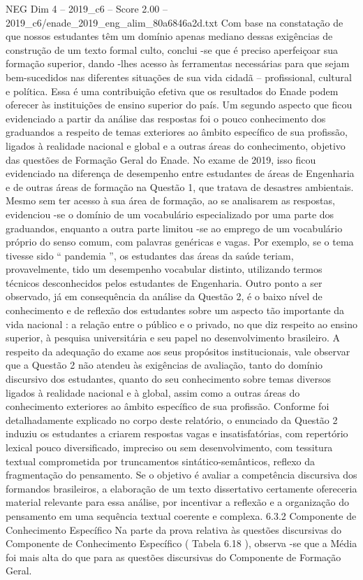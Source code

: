 \begin{textsample}{NEG Dim 4 – 2019\_c6 – Score 2.00 – 2019\_c6/enade\_2019\_eng\_alim\_80a6846a2d.txt}
Com base na constatação de que nossos estudantes têm um domínio apenas mediano dessas exigências de construção de um texto formal culto, conclui -se que é preciso aperfeiçoar sua formação superior, dando -lhes acesso às ferramentas necessárias para que sejam bem-sucedidos nas diferentes situações de sua vida cidadã – profissional, cultural e política.
Essa é uma contribuição efetiva que os resultados do Enade podem oferecer às instituições de ensino superior do país.
Um segundo aspecto que ficou evidenciado a partir da análise das respostas foi o pouco conhecimento dos graduandos a respeito de temas exteriores ao âmbito específico de sua profissão, ligados à realidade nacional e global e a outras áreas do conhecimento, objetivo das questões de Formação Geral do Enade.
No exame de 2019, isso ficou evidenciado na diferença de desempenho entre estudantes de áreas de Engenharia e de outras áreas de formação na Questão 1, que tratava de desastres ambientais.
Mesmo sem ter acesso à sua área de formação, ao se analisarem as respostas, evidenciou -se o domínio de um vocabulário especializado por uma parte dos graduandos, enquanto a outra parte limitou -se ao emprego de um vocabulário próprio do senso comum, com palavras genéricas e vagas.
Por exemplo, se o tema tivesse sido “ pandemia ”, os estudantes das áreas da saúde teriam, provavelmente, tido um desempenho vocabular distinto, utilizando termos técnicos desconhecidos pelos estudantes de Engenharia.
Outro ponto a ser observado, já em consequência da análise da Questão 2, é o baixo nível de conhecimento e de reflexão dos estudantes sobre um aspecto tão importante da vida nacional : a relação entre o público e o privado, no que diz respeito ao ensino superior, à pesquisa universitária e seu papel no desenvolvimento brasileiro.
A respeito da adequação do exame aos seus propósitos institucionais, vale observar que a Questão 2 não atendeu às exigências de avaliação, tanto do domínio discursivo dos estudantes, quanto do seu conhecimento sobre temas diversos ligados à realidade nacional e à global, assim como a outras áreas do conhecimento exteriores ao âmbito específico de sua profissão.
Conforme foi detalhadamente explicado no corpo deste relatório, o enunciado da Questão 2 induziu os estudantes a criarem respostas vagas e insatisfatórias, com repertório lexical pouco diversificado, impreciso ou sem desenvolvimento, com tessitura textual comprometida por truncamentos sintático-semânticos, reflexo da fragmentação do pensamento.
Se o objetivo é avaliar a competência discursiva dos formandos brasileiros, a elaboração de um texto dissertativo certamente ofereceria material relevante para essa análise, por incentivar a reflexão e a organização do pensamento em uma sequência textual coerente e complexa. 6.3.2 Componente de Conhecimento Específico Na parte da prova relativa às questões discursivas do Componente de Conhecimento Específico ( Tabela 6.18 ), observa -se que a Média foi mais alta do que para as questões discursivas do Componente de Formação Geral.

\end{textsample}
